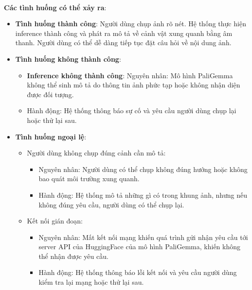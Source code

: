 \documentclass[a4paper,12pt]{article}
\begin{document}
\\
\textbf{Các tình huống có thể xảy ra}:
\begin{itemize}
    \item \textbf{Tình huống thành công}: Người dùng chụp ảnh rõ nét. Hệ thống thực hiện inference thành công và phát ra mô tả về cảnh vật xung quanh bằng âm thanh. Người dùng có thể dễ dàng tiếp tục đặt câu hỏi về nội dung ảnh.
    \item \textbf{Tình huống không thành công}:
    \begin{itemize}
        \item \textbf{Inference không thành công}: Nguyên nhân: Mô hình PaliGemma không thể sinh mô tả do thông tin ảnh phức tạp hoặc không nhận diện được đối tượng.
        \item Hành động: Hệ thống thông báo sự cố và yêu cầu người dùng chụp lại hoặc thử lại sau.
    \end{itemize}
    \item \textbf{Tình huống ngoại lệ}:
    \begin{itemize}
        \item Người dùng không chụp đúng cảnh cần mô tả:
        \begin{itemize}
            \item Nguyên nhân: Người dùng có thể chụp không đúng hướng hoặc không bao quát môi trường xung quanh.
            \item Hành động: Hệ thống mô tả những gì có trong khung ảnh, nhưng nếu không đúng yêu cầu, người dùng có thể chụp lại.
        \end{itemize}
        \item Kết nối gián đoạn:
        \begin{itemize}
            \item Nguyên nhân: Mất kết nối mạng khiến quá trình gửi nhận yêu cầu tới server API của HuggingFace của mô hình PaliGemma, khiến không thể nhận được yêu cầu.
            \item Hành động: Hệ thống thông báo lỗi kết nối và yêu cầu người dùng kiểm tra lại mạng hoặc thử lại sau.
        \end{itemize}
    \end{itemize}
\end{itemize}
\\
\end{document}
